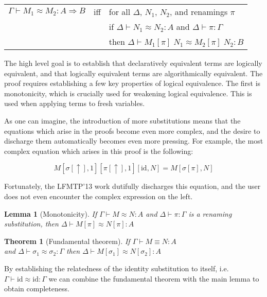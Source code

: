 \documentclass{article}
\newtheorem{lemma}{Lemma}
\newtheorem{theorem}{Theorem}
\begin{document}
\begin{center}
  \begin{tabular}{@{}l@{~~~}l@{~~~}l@{}}
$\Gamma \vdash M_1 \approx M_2 : A \Rightarrow B$ & iff & for all
$\Delta$, $N_1$, $N_2$, and renamings $\pi$ \\
& & if $\Delta \vdash N_1 \approx N_2 : A$ and $\Delta \vdash \pi : \Gamma$ \\
& & then $\Delta \vdash M_1[\pi]\; N_1 \approx M_2[\pi]\; N_2 : B$
  \end{tabular}
\end{center}

The high level goal is to establish that declaratively equivalent
terms are logically equivalent, and that logically equivalent terms
are algorithmically equivalent. The proof requires establishing a
few key properties of logical equivalence. The first is
monotonicity, which is crucially used for weakening logical
equivalence. This is used when applying terms to fresh variables.

As one can imagine, the introduction of more substitutions means that
the equations which arise in the proofs become even more complex, and
the desire to discharge them automatically becomes even more
pressing. For example, the most complex equation which arises in this
proof is the following:

$$
M[\sigma[\uparrow],1][\pi[\uparrow],1][\text{id}, N] = M[\sigma[\pi],N]
$$

Fortunately, the LFMTP'13 work dutifully discharges this equation, and the user
does not even encounter the complex expression on the left.

\begin{lemma}[Monotonicity]
If $\Gamma \vdash M \approx N : A$ and $\Delta \vdash \pi : \Gamma$ is
a renaming substitution, then $\Delta \vdash M[\pi] \approx N[\pi] : A$
\end{lemma}

\begin{theorem}[Fundamental theorem]
If $\Gamma \vdash M \equiv N : A$ \\ and $\Delta \vdash \sigma_1 \approx
\sigma_2 : \Gamma$ then $\Delta \vdash M[\sigma_1] \approx
N[\sigma_2] : A$
\end{theorem}

By establishing the relatedness of the identity substitution to
itself, i.e. $\Gamma \vdash \mathrm{id} \approx \mathrm{id} : \Gamma$ we can combine the
fundamental theorem with the main lemma to obtain completeness.
\end{document}
